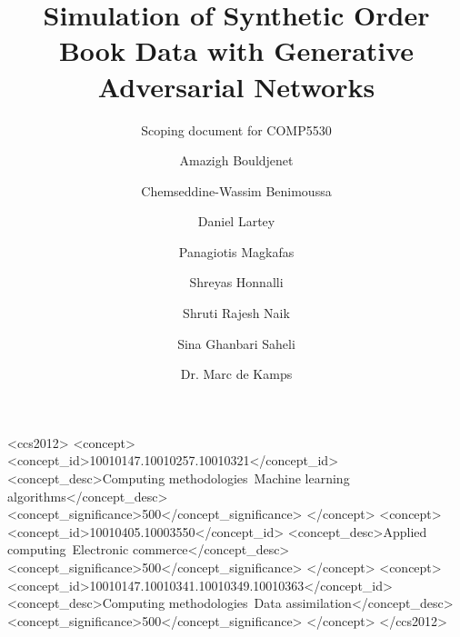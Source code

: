 \documentclass[acmtog, nonacm]{acmart}
\begin{document}
\title{Simulation of Synthetic Order Book Data with Generative Adversarial Networks}
\subtitle{Scoping document for COMP5530}

\author{Amazigh Bouldjenet}
\author{Chemseddine-Wassim Benimoussa}
\authornotemark[1]
\author{Daniel Lartey}
\authornotemark[1]
\author{Panagiotis Magkafas}
\authornotemark[1]
\author{Shreyas Honnalli}
\authornotemark[1]
\author{Shruti Rajesh Naik}
\authornotemark[1]
\author{Sina Ghanbari Saheli}
\authornotemark[1]

\author{Dr. Marc de Kamps}



\begin{CCSXML}
<ccs2012>
   <concept>
       <concept_id>10010147.10010257.10010321</concept_id>
       <concept_desc>Computing methodologies~Machine learning algorithms</concept_desc>
       <concept_significance>500</concept_significance>
       </concept>
   <concept>
       <concept_id>10010405.10003550</concept_id>
       <concept_desc>Applied computing~Electronic commerce</concept_desc>
       <concept_significance>500</concept_significance>
       </concept>
   <concept>
       <concept_id>10010147.10010341.10010349.10010363</concept_id>
       <concept_desc>Computing methodologies~Data assimilation</concept_desc>
       <concept_significance>500</concept_significance>
       </concept>
 </ccs2012>
\end{CCSXML}
\end{document}
